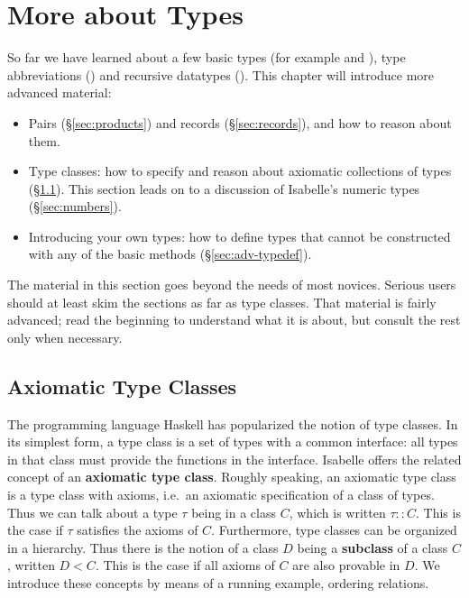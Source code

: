 \chapter{More about Types}
\label{ch:more-types}

So far we have learned about a few basic types (for example  and
), type abbreviations () and recursive datatypes
(). This chapter will introduce more
advanced material:
\begin{itemize}
\item Pairs ({\S}\ref{sec:products}) and records ({\S}\ref{sec:records}),
and how to reason about them.
\item Type classes: how to specify and reason about axiomatic collections of
  types ({\S}\ref{sec:axclass}). This section leads on to a discussion of
  Isabelle's numeric types ({\S}\ref{sec:numbers}).  
\item Introducing your own types: how to define types that
  cannot be constructed with any of the basic methods
  ({\S}\ref{sec:adv-typedef}).
\end{itemize}

The material in this section goes beyond the needs of most novices.
Serious users should at least skim the sections as far as type classes.
That material is fairly advanced; read the beginning to understand what it
is about, but consult the rest only when necessary.




\section{Axiomatic Type Classes} %
\label{sec:axclass}

The programming language Haskell has popularized the notion of type classes.
In its simplest form, a type class is a set of types with a common interface:
all types in that class must provide the functions in the interface.
Isabelle offers the related concept of an \textbf{axiomatic type class}.
Roughly speaking, an axiomatic type class is a type class with axioms, i.e.\ 
an axiomatic specification of a class of types. Thus we can talk about a type
$\tau$ being in a class $C$, which is written $\tau :: C$.  This is the case if
$\tau$ satisfies the axioms of $C$. Furthermore, type classes can be
organized in a hierarchy.  Thus there is the notion of a class $D$ being a
\textbf{subclass}\index{subclasses}
of a class $C$, written $D < C$. This is the case if all
axioms of $C$ are also provable in $D$. We introduce these concepts
by means of a running example, ordering relations.

